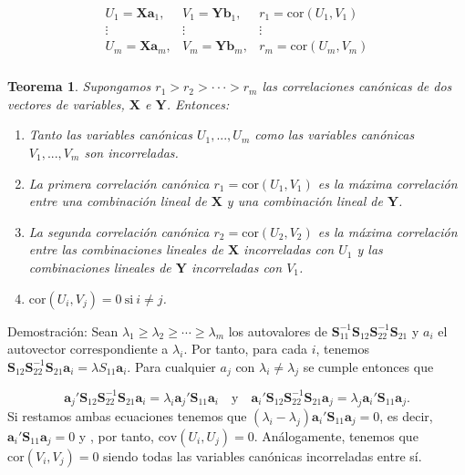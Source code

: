 \documentclass[tfg,cienciasbased,lot,lof,covers,final,overleaf,nocopyright]{tfgtfmthesisuam}
\newtheorem{teor}{Teorema}[chapter]
\begin{document}
\begin{align*}
\begin{array}{ccc}
    U_1 = \mathbf{Xa}_1, & V_1 = \mathbf{Yb}_1, & r_1 = \mbox{cor}(U_1,V_1)\\
    \vdots & \vdots & \vdots\\
    U_m = \mathbf{Xa}_m, & V_m = \mathbf{Yb}_m, & r_m = \mbox{cor}(U_m,V_m)\\
\end{array}
\end{align*}

\begin{teor}
    Supongamos $r_1 > r_2 > ··· > r_m$ las correlaciones canónicas de dos vectores de variables, $\mathbf{X}$ e $\mathbf{Y}$. Entonces:
    \begin{enumerate}
        \item Tanto las variables canónicas $U_1, ..., U_m$ como las variables canónicas $V_1, ..., V_m$ son incorreladas.
        \item La primera correlación canónica $r_1 = \mbox{cor}(U_1, V_1)$ es la máxima correlación entre una combinación lineal de $\mathbf{X}$ y una combinación lineal de $\mathbf{Y}$.
        \item La segunda correlación canónica $r_2 = \mbox{cor}(U_2, V_2)$ es la máxima correlación entre las combinaciones lineales de $\mathbf{X}$ incorreladas con $U_1$ y las combinaciones lineales de $\mathbf{Y}$ incorreladas con $V_1$.
        \item $\mbox{cor}(U_i, V_j)=0 \mathrm{\ si\ } i \neq j$.
    \end{enumerate}
\end{teor}
Demostración:
Sean $\lambda_1 \geq \lambda_2 \geq \cdots \geq \lambda_m$ los autovalores de $\mathbf{S}_{11}^{-1}\mathbf{S}_{12}\mathbf{S}_{22}^{-1}\mathbf{S}_{21}$ y $a_i$ el autovector correspondiente a $\lambda_i$. Por tanto, para cada $i$, tenemos $\mathbf{S}_{12}\mathbf{S}_{22}^{-1}\mathbf{S}_{21}\mathbf{a}_i = \lambda S_{11}\mathbf{a}_i$. Para cualquier $a_j$ con $\lambda_i \neq \lambda_j$ se cumple entonces que

\begin{equation*}
    \mathbf{a}_j'\mathbf{S}_{12}\mathbf{S}_{22}^{-1}\mathbf{S}_{21}\mathbf{a}_i = \lambda_i\mathbf{a}_j'\mathbf{S}_{11}\mathbf{a}_i \quad \mbox{y} \quad
    \mathbf{a}_i'\mathbf{S}_{12}\mathbf{S}_{22}^{-1}\mathbf{S}_{21}\mathbf{a}_j = \lambda_j\mathbf{a}_i'\mathbf{S}_{11}\mathbf{a}_j.
\end{equation*}
Si restamos ambas ecuaciones tenemos que $(\lambda_i - \lambda_j) \mathbf{a}_i'\mathbf{S}_{11}\mathbf{a}_j = 0$, es decir, $\mathbf{a}_i'\mathbf{S}_{11}\mathbf{a}_j = 0$ y , por tanto, $\mbox{cov}(U_i, U_j) = 0$. Análogamente, tenemos que $\mbox{cor}(V_i, V_j) = 0$ siendo todas las variables canónicas incorreladas entre sí.
\end{document}
